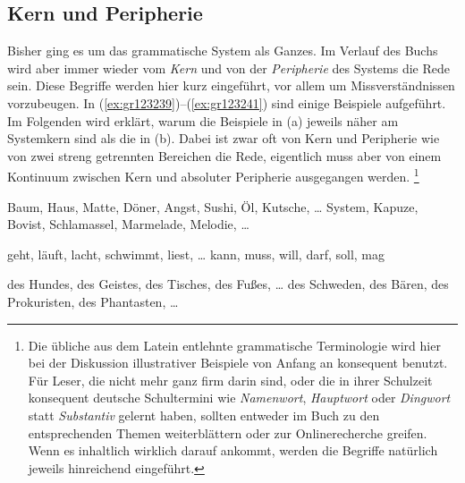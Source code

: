 \subsection{Kern und Peripherie}

\label{sec:kern}


Bisher ging es um das grammatische System als Ganzes.
Im Verlauf des Buchs wird aber immer wieder vom \textit{Kern} und von der \textit{Peripherie} des Systems die Rede sein.
Diese Begriffe werden hier kurz eingeführt, vor allem um Missverständnissen vorzubeugen.
In (\ref{ex:gr123239})--(\ref{ex:gr123241}) sind einige Beispiele aufgeführt.
Im Folgenden wird erklärt, warum die Beispiele in (a) jeweils näher am Systemkern sind als die in (b).
Dabei ist zwar oft von Kern und Peripherie wie von zwei streng getrennten Bereichen die Rede, eigentlich muss aber von einem Kontinuum zwischen Kern und absoluter Peripherie ausgegangen werden.%
\footnote{Die übliche aus dem Latein entlehnte grammatische Terminologie wird hier bei der Diskussion illustrativer Beispiele von Anfang an konsequent benutzt.
Für Leser, die nicht mehr ganz firm darin sind, oder die in ihrer Schulzeit konsequent deutsche Schultermini wie \zB \textit{Namenwort}, \textit{Hauptwort} oder \textit{Dingwort} statt \textit{Substantiv} gelernt haben, sollten entweder im Buch zu den entsprechenden Themen weiterblättern oder zur Onlinerecherche greifen.
Wenn es inhaltlich wirklich darauf ankommt, werden die Begriffe natürlich jeweils hinreichend eingeführt.}

\begin{exe}
	\ex\label{ex:gr123239}
	\begin{xlist}
		\ex\label{ex:gr123239a} Baum, Haus, Matte, Döner, Angst, Sushi, Öl, Kutsche, \ldots
		\ex\label{ex:gr123239b} System, Kapuze, Bovist, Schlamassel, Marmelade, Melodie, \ldots
	\end{xlist}
	\ex\label{ex:gr123240}
	\begin{xlist}
		\ex\label{ex:gr123240a} geht, läuft, lacht, schwimmt, liest, \ldots
		\ex\label{ex:gr123240b} kann, muss, will, darf, soll, mag 
	\end{xlist}
	\ex\label{ex:gr123241}
	\begin{xlist}
		\ex\label{ex:gr123241a} des Hundes, des Geistes, des Tisches, des Fußes, \ldots
		\ex\label{ex:gr123241b} des Schweden, des Bären, des Prokuristen, des Phantasten, \ldots
	\end{xlist}
\end{exe}

